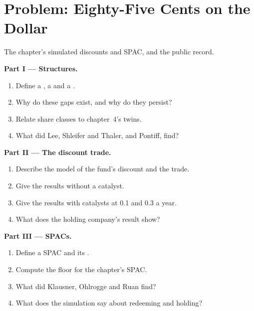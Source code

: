 \section{Problem: Eighty-Five Cents on the Dollar}

\begin{problem}\label{pb:s1:share-classes-holding-companies-closed-end-funds-spacs:1}
The chapter's simulated discounts and SPAC, and the public record.

\medskip\noindent\textbf{Part I --- Structures.}
\begin{enumerate}
\item Define a , a  and a .
\item Why do these gaps exist, and why do they persist?
\item Relate share classes to chapter~4's twins.
\item What did Lee, Shleifer and Thaler, and Pontiff, find?
\end{enumerate}

\medskip\noindent\textbf{Part II --- The discount trade.}
\begin{enumerate}[resume]
\item Describe the model of the fund's discount and the trade.
\item Give the results without a catalyst.
\item Give the results with catalysts at 0.1 and 0.3 a year.
\item What does the holding company's result show?
\end{enumerate}

\medskip\noindent\textbf{Part III --- SPACs.}
\begin{enumerate}[resume]
\item Define a SPAC and its .
\item Compute the floor for the chapter's SPAC.
\item What did Klausner, Ohlrogge and Ruan find?
\item What does the simulation say about redeeming and holding?
\end{enumerate}


\end{problem}
